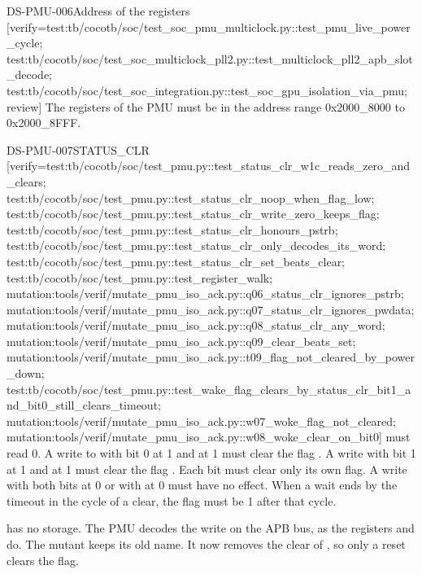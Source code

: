 \begin{requirement}{DS-PMU-006}{Address of the registers}
[verify={test:tb/cocotb/soc/test_soc_pmu_multiclock.py::test_pmu_live_power_cycle; test:tb/cocotb/soc/test_soc_multiclock_pll2.py::test_multiclock_pll2_apb_slot_decode; test:tb/cocotb/soc/test_soc_integration.py::test_soc_gpu_isolation_via_pmu; review}]
The registers of the PMU must be in the address range 0x2000\_8000 to 0x2000\_8FFF.
\end{requirement}

\begin{requirement}{DS-PMU-007}{STATUS\_CLR}
[verify={test:tb/cocotb/soc/test_pmu.py::test_status_clr_w1c_reads_zero_and_clears; test:tb/cocotb/soc/test_pmu.py::test_status_clr_noop_when_flag_low; test:tb/cocotb/soc/test_pmu.py::test_status_clr_write_zero_keeps_flag; test:tb/cocotb/soc/test_pmu.py::test_status_clr_honours_pstrb; test:tb/cocotb/soc/test_pmu.py::test_status_clr_only_decodes_its_word; test:tb/cocotb/soc/test_pmu.py::test_status_clr_set_beats_clear; test:tb/cocotb/soc/test_pmu.py::test_register_walk; mutation:tools/verif/mutate_pmu_iso_ack.py::q06_status_clr_ignores_pstrb; mutation:tools/verif/mutate_pmu_iso_ack.py::q07_status_clr_ignores_pwdata; mutation:tools/verif/mutate_pmu_iso_ack.py::q08_status_clr_any_word; mutation:tools/verif/mutate_pmu_iso_ack.py::q09_clear_beats_set; mutation:tools/verif/mutate_pmu_iso_ack.py::t09_flag_not_cleared_by_power_down; test:tb/cocotb/soc/test_pmu.py::test_wake_flag_clears_by_status_clr_bit1_and_bit0_still_clears_timeout; mutation:tools/verif/mutate_pmu_iso_ack.py::w07_woke_flag_not_cleared; mutation:tools/verif/mutate_pmu_iso_ack.py::w08_woke_clear_on_bit0}]
 must read 0. A write to  with bit 0 at 1 and  at 1 must clear the flag . A write with bit 1 at 1 and  at 1 must clear the flag . Each bit must clear only its own flag. A write with both bits at 0 or with  at 0 must have no effect. When a wait ends by the timeout in the cycle of a clear, the flag must be 1 after that cycle.
\end{requirement}
\begin{information}
 has no storage. The PMU decodes the write on the APB bus, as the registers  and  do. The mutant  keeps its old name. It now removes the clear of , so only a reset clears the flag.
\end{information}

